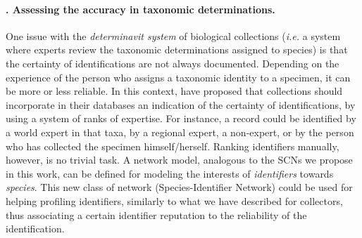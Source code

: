 \paragraph*{\theApplicationCase. Assessing the accuracy in taxonomic determinations.}
One issue with the \textit{determinavit system} 
of biological collections (\textit{i.e. }a system where experts review the taxonomic determinations assigned to species) is that the certainty  of identifications are not always documented.
Depending on the experience of the person who assigns a taxonomic identity to a specimen, it can be more or less reliable. 
In this context,  have proposed that collections should incorporate in their databases an indication of the certainty of identifications, by using a system of ranks of expertise. %
For instance, a record could be identified by a world expert in that taxa, by a regional expert, a non-expert, or by the person who has collected the specimen himself/herself.
Ranking identifiers manually, however, is no trivial task.
%
A network model, analogous to the SCNs we propose in this work, can be defined for modeling the interests of \textit{identifiers} towards \textit{species}.
This new class of network (Species-Identifier Network) could be used for helping profiling identifiers, similarly to what we have described for collectors, thus associating a certain identifier reputation to the reliability of the identification.









